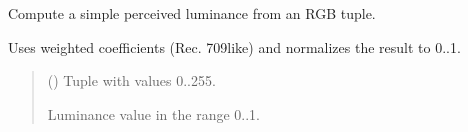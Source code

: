 \documentclass[letterpaper,10pt,english]{sphinxmanual}
\begin{document}

\begin{fulllineitems}
\label{\detokenize{api/colors:colors.luminance}}
\pysigstartsignatures
\pysiglinewithargsret
{}
{}
{}
\pysigstopsignatures
\sphinxAtStartPar
Compute a simple perceived luminance from an RGB tuple.

\sphinxAtStartPar
Uses weighted coefficients (Rec. 709\sphinxhyphen{}like) and normalizes the result to 0..1.
\begin{quote}\begin{description}
\sphinxAtStartPar
{} () \textendash{} Tuple  with values 0..255.

\sphinxAtStartPar
{}

\sphinxAtStartPar
Luminance value in the range 0..1.

\end{description}\end{quote}

\end{fulllineitems}

\end{document}
